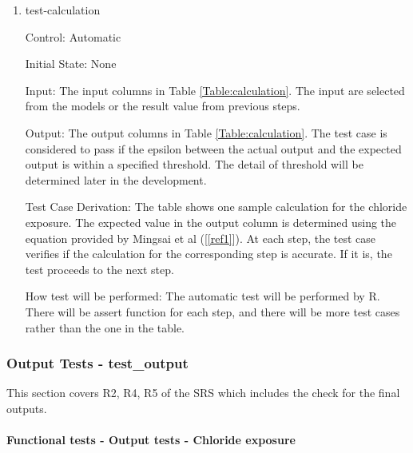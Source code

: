 \documentclass[12pt, titlepage]{article}
\newcommand{\reref}[1]{\ref{#1}}
\begin{document}
\begin{enumerate}

\item{test-calculation\\}
					
Control: Automatic 
					
Initial State: None 
					
Input: The input columns in Table \ref{Table:calculation}. The input are selected from the models or the result value from previous steps. 
					
Output: The output columns in Table \ref{Table:calculation}. The test case is considered to pass if the epsilon between the actual output and the expected output is within a specified threshold. The detail  of threshold will be determined later in the development.

Test Case Derivation: The table shows one sample calculation for the chloride exposure. The expected value in the output column is determined using the equation provided by Mingsai et al ([\reref{ref1}]). At each step, the test case verifies if the calculation for the corresponding step is accurate. If it is, the test proceeds to the next step. 
					
How test will be performed: The automatic test will be performed by R. There will be assert function for each step, and there will be more test cases rather than the one in the table.

\end{enumerate}





\subsubsection{Output Tests - test\_output}\label{t_output}
This section covers R2, R4, R5 of the SRS which includes the check for the final outputs.

		
\paragraph{Functional tests - Output tests - Chloride exposure}
\end{document}

